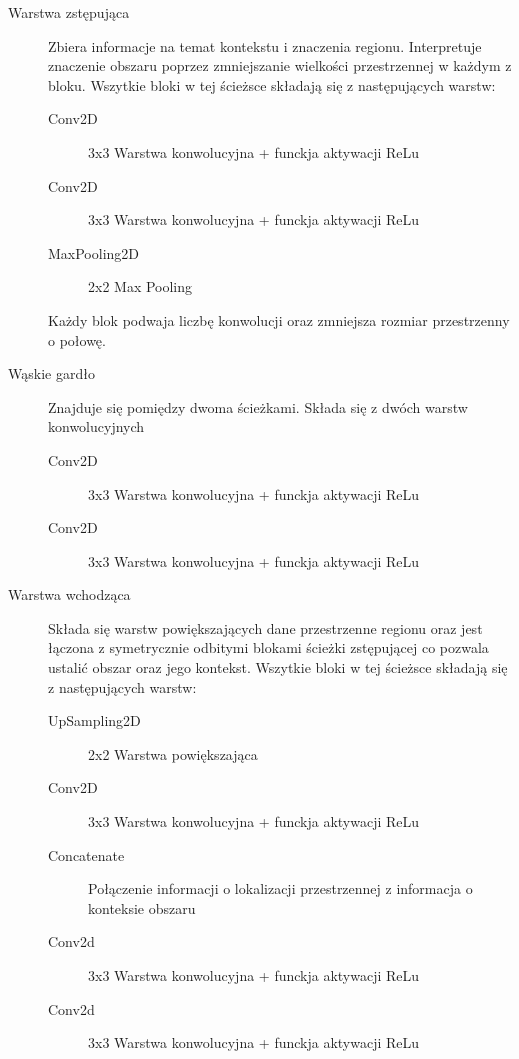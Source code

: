 \documentclass[a4paper,11pt,twoside]{report}
\theoremstyle{definition}
\begin{document}
\begin{description}
	\item [Warstwa zstępująca] Zbiera informacje na temat kontekstu i znaczenia regionu. Interpretuje znaczenie obszaru poprzez zmniejszanie wielkości przestrzennej w każdym z bloku. Wszytkie bloki w tej ścieżsce składają się z następujących warstw:
	\begin{description}
		\item [Conv2D] 3x3 Warstwa konwolucyjna + funckja aktywacji ReLu
		\item [Conv2D] 3x3 Warstwa konwolucyjna + funckja aktywacji ReLu
		\item [MaxPooling2D]2x2 Max Pooling
	\end{description}
   Każdy blok podwaja liczbę konwolucji oraz zmniejsza rozmiar przestrzenny o  połowę.
	
	\item [Wąskie gardło] Znajduje się pomiędzy dwoma ścieżkami. Składa się z dwóch warstw konwolucyjnych
		\begin{description}
		\item [Conv2D] 3x3 Warstwa konwolucyjna + funckja aktywacji ReLu
		\item [Conv2D] 3x3 Warstwa konwolucyjna + funckja aktywacji ReLu
		\end{description}
	
	\item [Warstwa wchodząca] Składa się warstw powiększających dane przestrzenne regionu oraz jest łączona z symetrycznie odbitymi blokami ścieżki zstępującej co pozwala ustalić obszar oraz jego kontekst. Wszytkie bloki w tej ścieżsce składają się z następujących warstw:
	\begin{description}
		\item [UpSampling2D] 2x2 Warstwa powiększająca
		\item [Conv2D] 3x3 Warstwa konwolucyjna + funckja aktywacji ReLu
		\item [Concatenate] Połączenie informacji o lokalizacji przestrzennej z informacja o konteksie obszaru
		\item [Conv2d] 3x3 Warstwa konwolucyjna + funckja aktywacji ReLu
		\item [Conv2d] 3x3 Warstwa konwolucyjna + funckja aktywacji ReLu
		
	\end{description}

\end{description} 


\par 
\end{document}
